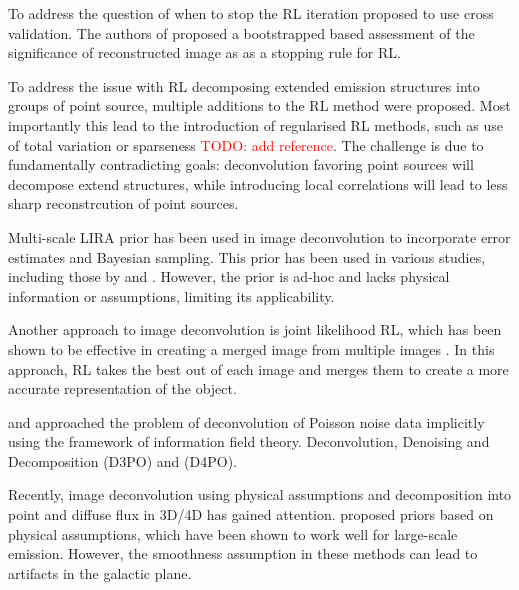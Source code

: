 \documentclass[twocolumn]{aastex631}
\newcommand{\todo}[1]{\textcolor{red}{TODO: #1}\PackageWarning{TODO:}{#1!}}
\begin{document}
    To address the question of when to stop the RL iteration \cite{Reeves1995} proposed to use cross validation. The authors of \citep{Bi1994} proposed a bootstrapped based assessment of the significance of reconstructed image as as a stopping rule for RL.
    
    To address the issue with RL decomposing extended emission structures into groups of point source, multiple additions to the RL method were proposed. Most importantly this lead to the introduction of regularised RL methods, such as use of total variation \citep{Dey2006} or sparseness \todo{add reference}. The challenge is due to fundamentally contradicting goals: deconvolution favoring point sources will decompose extend structures, while introducing local correlations will lead to less sharp reconstrcution of point sources.

    Multi-scale LIRA prior has been used in image deconvolution to incorporate error estimates and Bayesian sampling. This prior has been used in various studies, including those by \cite{Esch2004} and \cite{Connors2011}. However, the prior is ad-hoc and lacks physical information or assumptions, limiting its applicability.

    Another approach to image deconvolution is joint likelihood RL, which has been shown to be effective in creating a merged image from multiple images \cite{Ingaramo2014}. In this approach, RL takes the best out of each image and merges them to create a more accurate representation of the object.

    \cite{Pumpe2018} and \cite{Selig2015} approached the problem of deconvolution of Poisson noise data implicitly using the framework of information field theory. Deconvolution, Denoising and Decomposition (D3PO) and (D4PO). 
    
    Recently, image deconvolution using physical assumptions and decomposition into point and diffuse flux in 3D/4D has gained attention. proposed priors based on physical assumptions, which have been shown to work well for large-scale emission. However, the smoothness assumption in these methods can lead to artifacts in the galactic plane.
    
\end{document}

